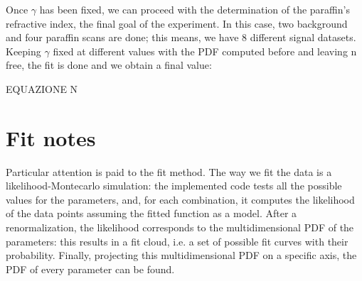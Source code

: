 \documentclass[a4paper, 12pt]{article}
\begin{document}
Once \(\gamma\) has been fixed, we can proceed with the determination of the paraffin’s refractive index, the final goal of the experiment. In this case, two background and four paraffin scans are done; this means, we have 8 different signal datasets. Keeping \(\gamma\) fixed at different values with the PDF computed before and leaving n free, the fit is done and we obtain a final value:

EQUAZIONE N

\section{Fit notes}

Particular attention is paid to the fit method. The way we fit the data is a likelihood-Montecarlo simulation: the implemented code tests all the possible values for the parameters, and, for each combination, it computes the likelihood of the data points assuming the fitted function as a model. After a renormalization, the likelihood corresponds to the multidimensional PDF of the parameters: this results in a fit cloud, i.e. a set of possible fit curves with their probability. Finally, projecting this multidimensional PDF on a specific axis, the PDF of every parameter can be found.
\end{document}
